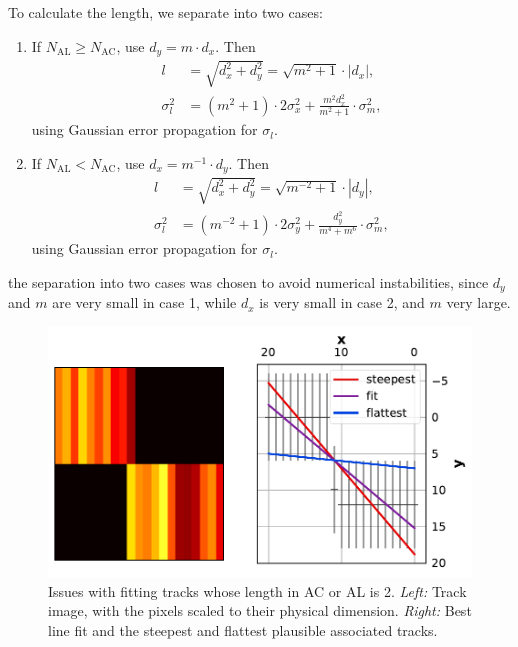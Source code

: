 \documentclass[a4paper, 11pt]{article}
\begin{document}
To calculate the length, we separate into two cases:
\begin{enumerate}
  \item If $N_\mathrm{AL} \geq N_\mathrm{AC}$, use $d_y = m \cdot d_x$. Then
    \begin{align}
      l &= \sqrt{d_x^{2} + d_y^{2}} = \sqrt{m^{2} + 1} \cdot |d_x|,\\
      \sigma_l^{2} &= \left( m^{2} + 1 \right) \cdot 2 \sigma_x^{2} + \frac{m^{2} d_x^{2}}{m^{2}+1}  \cdot \sigma_m^{2},
    \end{align}
    using Gaussian error propagation for $\sigma_l$.
  \item If $N_\mathrm{AL} < N_\mathrm{AC}$, use $d_x = m^{-1} \cdot d_y$. Then
    \begin{align}
      l &= \sqrt{d_x^{2} + d_y^{2}} = \sqrt{m^{-2} + 1} \cdot |d_y|,\\
      \sigma_l^{2} &= \left( m^{-2} + 1 \right) \cdot 2 \sigma_y^{2} + \frac{d_y^{2}}{m^{4}+m^{6}}  \cdot \sigma_m^{2},
    \end{align}
    using Gaussian error propagation for $\sigma_l$.
\end{enumerate}

the separation into two cases was chosen to avoid numerical instabilities, since $d_y$ and $m$ are very small in case 1, while $d_x$ is very small in case 2, and $m$ very large.

\begin{figure}
  \centering
  \includegraphics{images/postprocessing/2D_badfit}
  \caption{Issues with fitting tracks whose length in AC or AL is 2. \textit{Left:} Track image, with the pixels scaled to their physical dimension. \textit{Right:} Best line fit and the steepest and flattest plausible associated tracks.}
  \label{fig:2D_badfit}
\end{figure}
\end{document}
